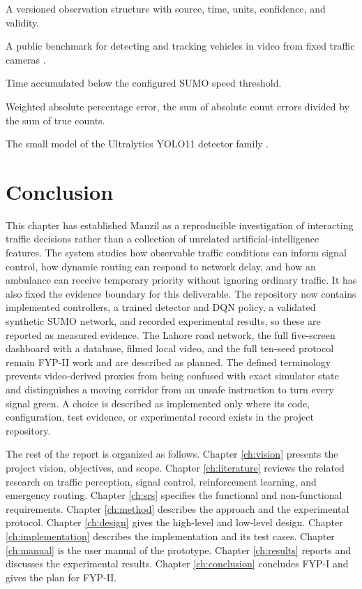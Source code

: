 \begin{description}[font=\normalfont,leftmargin=0pt,labelindent=0pt,itemindent=0pt,labelsep=0.45em,itemsep=0pt,parsep=0pt,topsep=0.25\baselineskip]
\item[Traffic-state contract:] A versioned observation structure with source, time, units, confidence, and validity.
\item[UA-DETRAC:] A public benchmark for detecting and tracking vehicles in video from fixed traffic cameras \cite{wen2020uadetrac}.
\item[Waiting time:] Time accumulated below the configured SUMO speed threshold.
\item[WAPE:] Weighted absolute percentage error, the sum of absolute count errors divided by the sum of true counts.
\item[YOLO11s:] The small model of the Ultralytics YOLO11 detector family \cite{ultralytics2024yolo11}.
\end{description}

\section{Conclusion}

This chapter has established Manzil as a reproducible investigation of interacting traffic decisions rather than a collection of unrelated artificial-intelligence features. The system studies how observable traffic conditions can inform signal control, how dynamic routing can respond to network delay, and how an ambulance can receive temporary priority without ignoring ordinary traffic. It has also fixed the evidence boundary for this deliverable. The repository now contains implemented controllers, a trained detector and DQN policy, a validated synthetic SUMO network, and recorded experimental results, so these are reported as measured evidence. The Lahore road network, the full five-screen dashboard with a database, filmed local video, and the full ten-seed protocol remain FYP-II work and are described as planned. The defined terminology prevents video-derived proxies from being confused with exact simulator state and distinguishes a moving corridor from an unsafe instruction to turn every signal green. A choice is described as implemented only where its code, configuration, test evidence, or experimental record exists in the project repository.

The rest of the report is organized as follows. Chapter \ref{ch:vision} presents the project vision, objectives, and scope. Chapter \ref{ch:literature} reviews the related research on traffic perception, signal control, reinforcement learning, and emergency routing. Chapter \ref{ch:srs} specifies the functional and non-functional requirements. Chapter \ref{ch:method} describes the approach and the experimental protocol. Chapter \ref{ch:design} gives the high-level and low-level design. Chapter \ref{ch:implementation} describes the implementation and its test cases. Chapter \ref{ch:manual} is the user manual of the prototype. Chapter \ref{ch:results} reports and discusses the experimental results. Chapter \ref{ch:conclusion} concludes FYP-I and gives the plan for FYP-II.
